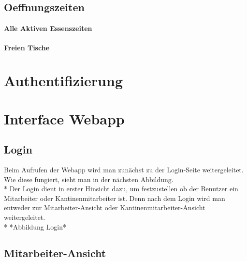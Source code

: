 \subsection{Oeffnungszeiten}

\paragraph{Alle Aktiven Essenszeiten}

\paragraph{Freien Tische}


\section{Authentifizierung}

\section {Interface Webapp}
\subsection{Login}
Beim Aufrufen der Webapp wird man zunächst zu der Login-Seite weitergeleitet. Wie diese fungiert, sieht man in der nächsten Abbildung. \\*
Der Login dient in erster Hinsicht dazu, um festzustellen ob der Benutzer ein Mitarbeiter oder Kantinenmitarbeiter ist.
Denn nach dem Login wird man entweder zur Mitarbeiter-Ansicht oder Kantinenmitarbeiter-Ansicht weitergeleitet. \\*
*Abbildung Login*

\subsection {Mitarbeiter-Ansicht}


